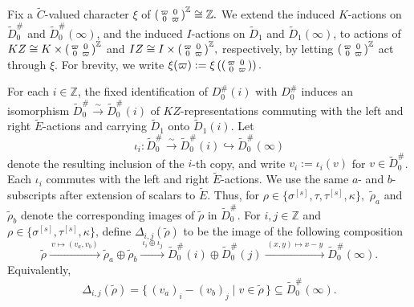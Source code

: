 \documentclass[a4paper,10pt,twoside]{amsart}
\newcommand{\M}{\widetilde{D}_0^\#(\infty)}
\theoremstyle{definition}
\numberwithin{equation}{section}
\begin{document}
Fix a \(\widetilde C\)-valued character \(\xi\) of
\(
\begin{psmallmatrix}
\varpi&0\\
0&\varpi
\end{psmallmatrix}^{\mathbb{Z}}\cong \mathbb{Z}.
\)
We extend the induced \(K\)-actions on
\(\widetilde D_0^\#\) and \(\widetilde D_0^\#(\infty)\), and the
induced \(I\)-actions on \(\widetilde D_1\) and
\(\widetilde D_1(\infty)\), to actions of
\(
KZ\cong
K\times
\begin{psmallmatrix}
\varpi&0\\
0&\varpi
\end{psmallmatrix}^{\mathbb{Z}}
\) and
\(
IZ\cong
I\times
\begin{psmallmatrix}
\varpi&0\\
0&\varpi
\end{psmallmatrix}^{\mathbb{Z}},
\) respectively, by letting
\(
\begin{psmallmatrix}
\varpi&0\\
0&\varpi
\end{psmallmatrix}^{\mathbb{Z}}
\) act through \(\xi\). For brevity, we write
\(
\xi(\varpi):=
\xi\left(
\begin{psmallmatrix}
\varpi&0\\
0&\varpi
\end{psmallmatrix}
\right).
\)

For each \(i\in\mathbb{Z}\), the fixed identification of
\(D_0^\#(i)\) with \(D_0^\#\) induces an isomorphism
\(
\widetilde D_0^\#
\xrightarrow{\sim}
\widetilde D_0^\#(i)
\) of \(KZ\)-representations commuting with the left and right
\(\widetilde E\)-actions and carrying \(\widetilde D_1\) onto
\(\widetilde D_1(i)\). Let
\[
\iota_i:
\widetilde D_0^\#
\xrightarrow{\sim}
\widetilde D_0^\#(i)
\hookrightarrow
\widetilde D_0^\#(\infty)
\]
denote the resulting inclusion of the \(i\)-th copy, and write
\(v_i:=\iota_i(v)\) for \(v\in\widetilde D_0^\#\). Each \(\iota_i\)
commutes with the left and right \(\widetilde E\)-actions. We use the
same \(a\)- and \(b\)-subscripts after extension of scalars to
\(\widetilde E\). Thus, for $\rho\in\{\sigma^{[s]},\tau,\tau^{[s]},\kappa\},
$ \(\widetilde{\rho}_a\) and \(\widetilde{\rho}_b\) denote the corresponding images of \(\widetilde{\rho}\) in \(\widetilde{D}_0^\#\). For \(i,j\in\mathbb Z\) and $\rho\in\{\sigma^{[s]},\tau^{[s]},\kappa\}$, define \(\Delta_{i,j}(\widetilde{\rho})\) to be the image of the
following composition
\[
\widetilde{\rho}
\xrightarrow{\ v\mapsto (v_a,v_b)\ }
\widetilde{\rho}_a\oplus\widetilde{\rho}_b
\xrightarrow{\ \iota_i\oplus\iota_j\ }
\widetilde{D}_0^\#(i)\oplus\widetilde{D}_0^\#(j)
\xrightarrow{\ (x,y)\mapsto x-y\ }
\M .
\]
Equivalently,
\begin{equation}\label{Del}
\Delta_{i,j}(\widetilde{\rho})
=
\{\, (v_a)_i-(v_b)_j \mid v\in\widetilde{\rho}\,\}
\subseteq \M .
\end{equation}
\end{document}
